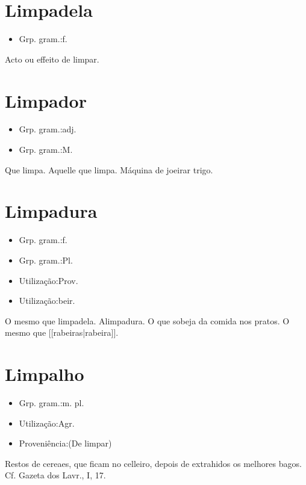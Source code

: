 \section{Limpadela}
\begin{itemize}
\item {Grp. gram.:f.}
\end{itemize}
Acto ou effeito de limpar.
\section{Limpador}
\begin{itemize}
\item {Grp. gram.:adj.}
\end{itemize}
\begin{itemize}
\item {Grp. gram.:M.}
\end{itemize}
Que limpa.
Aquelle que limpa.
Máquina de joeirar trigo.
\section{Limpadura}
\begin{itemize}
\item {Grp. gram.:f.}
\end{itemize}
\begin{itemize}
\item {Grp. gram.:Pl.}
\end{itemize}
\begin{itemize}
\item {Utilização:Prov.}
\end{itemize}
\begin{itemize}
\item {Utilização:beir.}
\end{itemize}
O mesmo que \textunderscore limpadela\textunderscore .
Alimpadura.
O que sobeja da comida nos pratos.
O mesmo que [[rabeiras|rabeira]].
\section{Limpalho}
\begin{itemize}
\item {Grp. gram.:m. pl.}
\end{itemize}
\begin{itemize}
\item {Utilização:Agr.}
\end{itemize}
\begin{itemize}
\item {Proveniência:(De \textunderscore limpar\textunderscore )}
\end{itemize}
Restos de cereaes, que ficam no celleiro, depois de extrahidos os melhores bagos. Cf. \textunderscore Gazeta dos Lavr.\textunderscore , I, 17.
